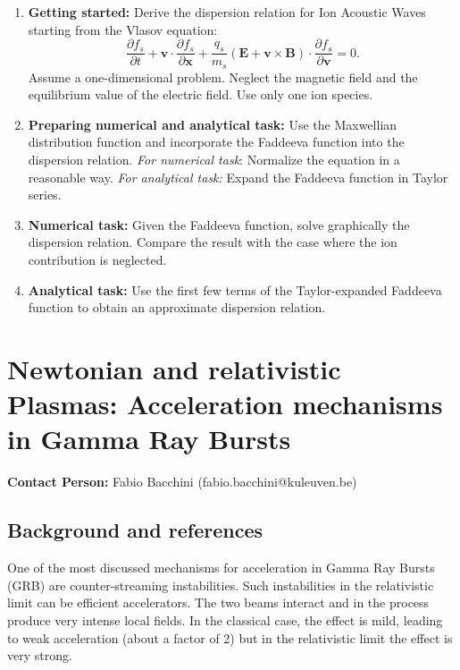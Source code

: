 \documentclass[11pt]{article}
\begin{document}
\begin{enumerate}
\item {\bf Getting started:}
Derive the dispersion relation for Ion Acoustic Waves starting from the Vlasov equation:
\begin{equation*}
    \frac{\partial f_s}{\partial t}+ \mathbf{v} \cdot \frac{\partial f_s}{\partial \mathbf{x}} + \frac{q_s}{m_s}(\mathbf{E}+\mathbf{v \times B}) \cdot \frac{\partial f_s}{\partial \mathbf{v}}=0.
\end{equation*}
Assume a one-dimensional problem. Neglect the magnetic field and the equilibrium value of the electric field. Use only one ion species.
\item {\bf Preparing numerical and analytical task:}
Use the Maxwellian distribution function and incorporate the Faddeeva function into the dispersion relation. \textit{For numerical task}: Normalize the equation in a reasonable way. \textit{For analytical task:} Expand the Faddeeva function in Taylor series.
\item {\bf Numerical task:}
Given the Faddeeva function, solve graphically the dispersion relation. Compare the result with the case where the ion contribution is neglected.
\item {\bf Analytical task:}
Use the first few terms of the Taylor-expanded Faddeeva function to obtain an approximate dispersion relation.
\end{enumerate}
\begin{comment}
Please try to have 3 different tasks for 3 different students
\end{comment}
\vfill \newpage

\section{Newtonian and relativistic Plasmas: Acceleration mechanisms in Gamma Ray Bursts}
{\bf Contact Person: } Fabio Bacchini (fabio.bacchini@kuleuven.be)
  
\subsection{Background and references}
One of the most discussed mechanisms for acceleration in Gamma Ray Bursts (GRB) 
are counter-streaming instabilities. Such instabilities in the relativistic 
limit can be efficient accelerators. The two beams interact and in the process 
produce very intense local fields. In the classical case, the effect is mild, 
leading to weak acceleration (about a factor of 2) but in the relativistic 
limit the effect is very strong.
\end{document}
